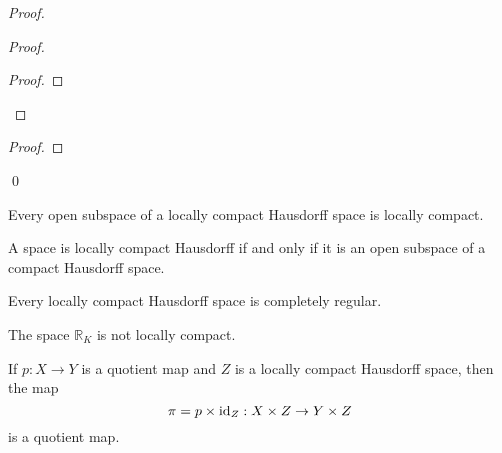 \begin{proof}
\begin{proof}
\begin{proof}
    \end{proof}
  \end{proof}
  \begin{proof}
  \end{proof}
  \qed
\end{proof}

\begin{cor}
  Every open subspace of a locally compact Hausdorff space is locally compact.
\end{cor}

\begin{cor}
  A space is locally compact Hausdorff if and only if it is an open subspace
  of a compact Hausdorff space.
\end{cor}

\begin{cor}
 Every locally compact Hausdorff space is completely regular.
\end{cor}

\begin{cor}
  The space $\mathbb{R}_K$ is not locally compact.
\end{cor}

  \begin{lm}[AC]
    \label{lm:topology:locally_compact:quotient}
 If $p : X \rightarrow Y$ is a quotient map and $Z$ is a locally compact
Hausdorff space, then the map
\[ \pi = p \times \mathrm{id}_{Z} : X \times Z \rightarrow Y \times Z \]
is a quotient map.
\end{lm}

